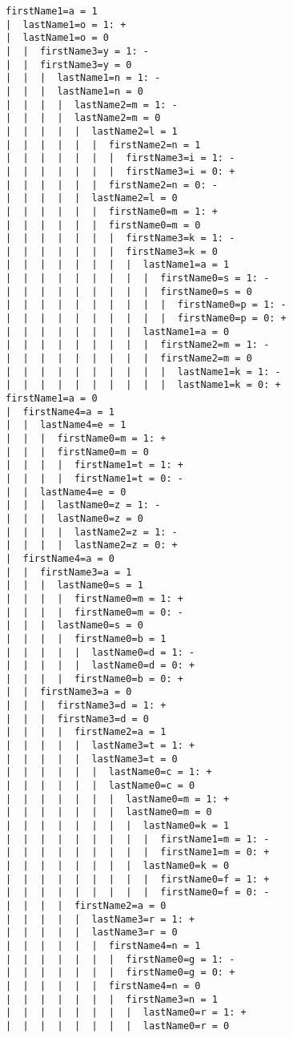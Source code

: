 \begin{enumerate}
\begin{enumerate}
\begin{lstlisting}
firstName1=a = 1
|  lastName1=o = 1: +
|  lastName1=o = 0
|  |  firstName3=y = 1: -
|  |  firstName3=y = 0
|  |  |  lastName1=n = 1: -
|  |  |  lastName1=n = 0
|  |  |  |  lastName2=m = 1: -
|  |  |  |  lastName2=m = 0
|  |  |  |  |  lastName2=l = 1
|  |  |  |  |  |  firstName2=n = 1
|  |  |  |  |  |  |  firstName3=i = 1: -
|  |  |  |  |  |  |  firstName3=i = 0: +
|  |  |  |  |  |  firstName2=n = 0: -
|  |  |  |  |  lastName2=l = 0
|  |  |  |  |  |  firstName0=m = 1: +
|  |  |  |  |  |  firstName0=m = 0
|  |  |  |  |  |  |  firstName3=k = 1: -
|  |  |  |  |  |  |  firstName3=k = 0
|  |  |  |  |  |  |  |  lastName1=a = 1
|  |  |  |  |  |  |  |  |  firstName0=s = 1: -
|  |  |  |  |  |  |  |  |  firstName0=s = 0
|  |  |  |  |  |  |  |  |  |  firstName0=p = 1: -
|  |  |  |  |  |  |  |  |  |  firstName0=p = 0: +
|  |  |  |  |  |  |  |  lastName1=a = 0
|  |  |  |  |  |  |  |  |  firstName2=m = 1: -
|  |  |  |  |  |  |  |  |  firstName2=m = 0
|  |  |  |  |  |  |  |  |  |  lastName1=k = 1: -
|  |  |  |  |  |  |  |  |  |  lastName1=k = 0: +
firstName1=a = 0
|  firstName4=a = 1
|  |  lastName4=e = 1
|  |  |  firstName0=m = 1: +
|  |  |  firstName0=m = 0
|  |  |  |  firstName1=t = 1: +
|  |  |  |  firstName1=t = 0: -
|  |  lastName4=e = 0
|  |  |  lastName0=z = 1: -
|  |  |  lastName0=z = 0
|  |  |  |  lastName2=z = 1: -
|  |  |  |  lastName2=z = 0: +
|  firstName4=a = 0
|  |  firstName3=a = 1
|  |  |  lastName0=s = 1
|  |  |  |  firstName0=m = 1: +
|  |  |  |  firstName0=m = 0: -
|  |  |  lastName0=s = 0
|  |  |  |  firstName0=b = 1
|  |  |  |  |  lastName0=d = 1: -
|  |  |  |  |  lastName0=d = 0: +
|  |  |  |  firstName0=b = 0: +
|  |  firstName3=a = 0
|  |  |  firstName3=d = 1: +
|  |  |  firstName3=d = 0
|  |  |  |  firstName2=a = 1
|  |  |  |  |  lastName3=t = 1: +
|  |  |  |  |  lastName3=t = 0
|  |  |  |  |  |  lastName0=c = 1: +
|  |  |  |  |  |  lastName0=c = 0
|  |  |  |  |  |  |  lastName0=m = 1: +
|  |  |  |  |  |  |  lastName0=m = 0
|  |  |  |  |  |  |  |  lastName0=k = 1
|  |  |  |  |  |  |  |  |  firstName1=m = 1: -
|  |  |  |  |  |  |  |  |  firstName1=m = 0: +
|  |  |  |  |  |  |  |  lastName0=k = 0
|  |  |  |  |  |  |  |  |  firstName0=f = 1: +
|  |  |  |  |  |  |  |  |  firstName0=f = 0: -
|  |  |  |  firstName2=a = 0
|  |  |  |  |  lastName3=r = 1: +
|  |  |  |  |  lastName3=r = 0
|  |  |  |  |  |  firstName4=n = 1
|  |  |  |  |  |  |  firstName0=g = 1: -
|  |  |  |  |  |  |  firstName0=g = 0: +
|  |  |  |  |  |  firstName4=n = 0
|  |  |  |  |  |  |  firstName3=n = 1
|  |  |  |  |  |  |  |  lastName0=r = 1: +
|  |  |  |  |  |  |  |  lastName0=r = 0

\end{lstlisting}
\end{enumerate}
\end{enumerate}
